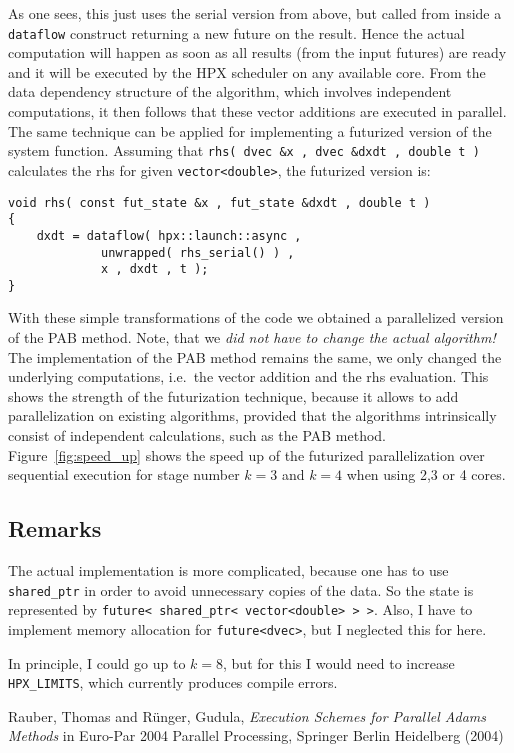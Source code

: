 \documentclass[10pt]{scrartcl}
\begin{document}
As one sees, this just uses the serial version from above, but called from inside a \lstinline+dataflow+ construct returning a new future on the result.
Hence the actual computation will happen as soon as all results (from the input futures) are ready and it will be executed by the HPX scheduler on any available core.
From the data dependency structure of the algorithm, which involves independent computations, it then follows that these vector additions are executed in parallel.
The same technique can be applied for implementing a futurized version of the system function.
Assuming that \lstinline+rhs( dvec &x , dvec &dxdt , double t )+ calculates the rhs for given \lstinline+vector<double>+, the futurized version is:
%
\begin{lstlisting}
void rhs( const fut_state &x , fut_state &dxdt , double t )
{
    dxdt = dataflow( hpx::launch::async , 
		     unwrapped( rhs_serial() ) ,  
		     x , dxdt , t );
}
\end{lstlisting}

With these simple transformations of the code we obtained a parallelized version of the PAB method.
Note, that we \emph{did not have to change the actual algorithm!}
The implementation of the PAB method remains the same, we only changed the underlying computations, i.e.\ the vector addition and the rhs evaluation.
This shows the strength of the futurization technique, because it allows to add parallelization on existing algorithms, provided that the algorithms intrinsically consist of independent calculations, such as the PAB method.
Figure~\ref{fig:speed_up} shows the speed up of the futurized parallelization over sequential execution for stage number $k=3$ and $k=4$ when using 2,3 or 4 cores.

\subsection*{Remarks}
The actual implementation is more complicated, because one has to use \lstinline+shared_ptr+ in order to avoid unnecessary copies of the data.
So the state is represented by \lstinline+future< shared_ptr< vector<double> > >+.
Also, I have to implement memory allocation for \lstinline+future<dvec>+, but I neglected this for here.

In principle, I could go up to $k=8$, but for this I would need to increase \lstinline+HPX_LIMITS+, which currently produces compile errors.

\begin{thebibliography}{10}
 Rauber, Thomas and R\"unger, Gudula, \textit{Execution Schemes for Parallel Adams Methods} in Euro-Par 2004 Parallel Processing, Springer Berlin Heidelberg (2004)
\end{thebibliography}
\end{document}
